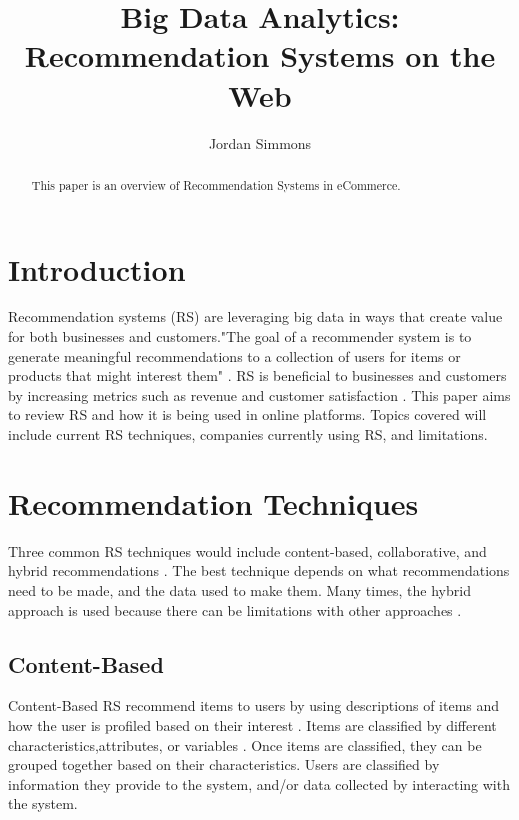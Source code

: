 \documentclass[sigconf]{acmart}
\begin{document}
\title{Big Data Analytics: Recommendation Systems on the Web}


\author{Jordan Simmons}

\renewcommand{\shortauthors}{B. Trovato et al.}


\begin{abstract}
This paper is an overview of Recommendation Systems in eCommerce.
\end{abstract}



\maketitle

\section{Introduction}

Recommendation systems (RS) are leveraging big data in ways that create value for both businesses and customers."The goal of a recommender system is to generate meaningful recommendations to a collection of users for items or products that might interest them" \cite{Melville2010}. RS is beneficial to businesses and customers by increasing metrics such as revenue and customer satisfaction \cite{Amatriain2006}. This paper aims to review RS and how it is being used in online platforms. Topics covered will include current RS techniques, companies currently using RS, and limitations.

\section{Recommendation Techniques}
Three common RS techniques would include content-based, collaborative, and hybrid recommendations \cite{Adomavicius2005}. The best technique depends on what recommendations need to be made, and the data used to make them. Many times, the hybrid approach is used because there can be limitations with other approaches \cite{Adomavicius2005}.
\subsection{Content-Based}
Content-Based RS recommend items to users by using descriptions of items and how the user is profiled based on their interest \cite {Pazzani2007}. Items are classified by different characteristics,attributes, or variables \cite{Pazzani2007}. Once items are classified, they can be grouped together based on their characteristics. Users are classified by information they provide to the system, and/or data collected by interacting with the system. 
\end{document}
